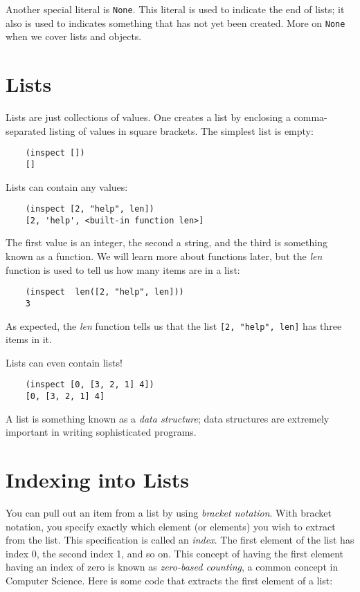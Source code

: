 Another special literal is \verb!None!.
This literal is used to
indicate the end of lists; it also is used
to indicates something that has not yet been
created. More on \verb!None! when we cover lists and
objects.

\section{Lists}

Lists are just collections of values. One creates a list by
enclosing a comma-separated listing of values in square brackets.
The simplest list is empty:

\begin{verbatim}
    (inspect [])
    []
\end{verbatim}

Lists can contain any values:

\begin{verbatim}
    (inspect [2, "help", len])
    [2, 'help', <built-in function len>]
\end{verbatim}

The first value is an integer, the second a string,
and the third is something known as a function. We will
learn more about functions later, but the {\it len} function
is used to tell us how many items are in a list:

\begin{verbatim}
    (inspect  len([2, "help", len]))
    3
\end{verbatim}

As expected, the {\it len} function tells us that the list
\verb![2, "help", len]! has three items in it.

Lists can even contain lists!

\begin{verbatim}
    (inspect [0, [3, 2, 1] 4])
    [0, [3, 2, 1] 4]
\end{verbatim}

A list is something known as a {\it data structure};
data structures are extremely important in writing
sophisticated programs.

\section{Indexing into Lists}

You can pull out an item from a list by using {\it bracket notation}.
With bracket notation, you specify exactly which element (or elements)
you wish to extract from the list. This specification is called an
{\it index}. The first element of the list has index 0, the second
index 1, and so on. This concept of having the first element having
an index of zero is known as {\it zero-based counting}, a common concept
in Computer Science. Here is some code that extracts the first element
of a list:

